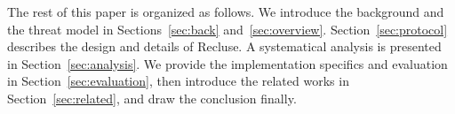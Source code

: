 The rest of this paper is organized as follows. We introduce the background and the threat model in Sections~\ref{sec:back} and~\ref{sec:overview}. Section~\ref{sec:protocol} describes the design  and details of Recluse. A systematical analysis is presented in Section~\ref{sec:analysis}. We provide the implementation specifics and evaluation in Section~\ref{sec:evaluation}, then introduce the related works in Section~\ref{sec:related}, and draw the conclusion finally. 




